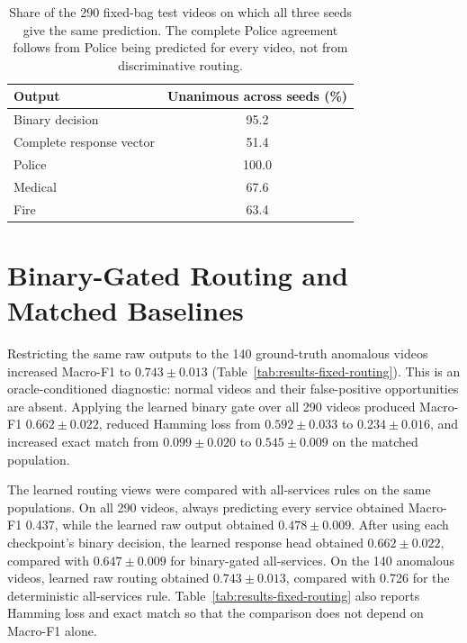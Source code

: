 \begin{table}[tbp]
    \centering
    \small
    \caption[Cross-seed unanimity of test predictions.]{Share of the 290 fixed-bag test videos on which all three seeds give the same prediction. The complete Police agreement follows from Police being predicted for every video, not from discriminative routing.}
    \label{tab:results-unanimity}
    \begin{tabular}{@{}lc@{}}
        \toprule
        \textbf{Output} & \textbf{Unanimous across seeds (\%)} \\
        \midrule
        Binary decision & 95.2 \\
        Complete response vector & 51.4 \\
        Police & 100.0 \\
        Medical & 67.6 \\
        Fire & 63.4 \\
        \bottomrule
    \end{tabular}
\end{table}

\section{Binary-Gated Routing and Matched Baselines}
\label{sec:results-fixed-routing}
\label{sec:results-fixed-baselines}

Restricting the same raw outputs to the 140 ground-truth anomalous videos increased Macro-F1 to $0.743 \pm 0.013$ (Table~\ref{tab:results-fixed-routing}). This is an oracle-conditioned diagnostic: normal videos and their false-positive opportunities are absent. Applying the learned binary gate over all 290 videos produced Macro-F1 $0.662 \pm 0.022$, reduced Hamming loss from $0.592 \pm 0.033$ to $0.234 \pm 0.016$, and increased exact match from $0.099 \pm 0.020$ to $0.545 \pm 0.009$ on the matched population.

The learned routing views were compared with all-services rules on the same populations. On all 290 videos, always predicting every service obtained Macro-F1 0.437, while the learned raw output obtained $0.478 \pm 0.009$. After using each checkpoint's binary decision, the learned response head obtained $0.662 \pm 0.022$, compared with $0.647 \pm 0.009$ for binary-gated all-services. On the 140 anomalous videos, learned raw routing obtained $0.743 \pm 0.013$, compared with 0.726 for the deterministic all-services rule. Table~\ref{tab:results-fixed-routing} also reports Hamming loss and exact match so that the comparison does not depend on Macro-F1 alone.

